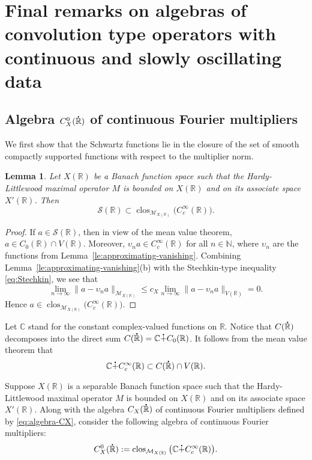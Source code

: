 \documentclass[reqno]{amsproc}
\newcommand{\cM}{\mathcal{M}}
\newcommand{\dR}{{\bf\dot{\R}}}
\newcommand{\C}{\mathbb{C}}
\newcommand{\N}{\mathbb{N}}
\newcommand{\R}{\mathbb{R}}
\newtheorem{lemma}[theorem]{Lemma}
\theoremstyle{definition}
\theoremstyle{remark}
\numberwithin{equation}{section}
\begin{document}
\section{Final remarks on algebras of convolution type operators with 
continuous and slowly oscillating data}
\label{sec:SO}
\subsection{Algebra $C_X^0(\dR)$ of continuous Fourier multipliers}
We first show that the Schwartz functions lie in the closure of the set 
of smooth compactly supported functions with respect to the multiplier norm.
\begin{lemma}\label{le:Schwartz-in-CX0}
Let $X(\R)$ be a Banach function space such that the Hardy-Little\-wood
maximal operator $M$ is bounded on $X(\R)$ and on its associate
space $X'(\R)$. Then 
\[
\mathcal{S}(\R)\subset \operatorname{clos}_{\cM_{X(\R)}}\big(C_c^\infty(\R)\big).
\]
\end{lemma}
\begin{proof}
If $a\in\mathcal{S}(\R)$, then in view of the mean value theorem,
$a\in C_0(\R)\cap V(\R)$. Moreover, $\upsilon_n a\in C_c^\infty(\R)$
for all $n\in\N$, where $\upsilon_n$ are the functions from 
Lemma~\ref{le:approximating-vanishing}. Combining 
Lemma~\ref{le:approximating-vanishing}(b) with the Stechkin-type inequality 
\eqref{eq:Stechkin}, we see that
\[
\lim_{n\to\infty}\|a-\upsilon_n a\|_{\cM_{X(\R)}}
\le 
c_X\lim_{n\to\infty}\|a-\upsilon_n a\|_{V(\R)}=0.
\]
Hence 
$a\in\operatorname{clos}_{\cM_{X(\R)}}\big(C_c^\infty(\R)\big)$.
\end{proof}
Let $\C$ stand for the constant complex-valued functions on $\R$. Notice that 
$C(\dR)$ decomposes into the direct sum $C(\dR)=\C\mathbf{\dot{+}}C_0(\R)$. 
It follows from the mean value theorem
that
\begin{equation}\label{eq:embedding-of-classes-of-conitnuous-functions}
\C\mathbf{\dot{+}}C_c^\infty(\R)\subset C(\dR)\cap V(\R).
\end{equation}

Suppose $X(\R)$ is a separable Banach function space such that the 
Hardy-Little\-wood maximal operator $M$ is bounded on $X(\R)$
and on its associate space $X'(\R)$. Along with the algebra
$C_X(\dR)$ of continuous Fourier multipliers defined by
\eqref{eq:algebra-CX}, consider the following algebra of continuous 
Fourier multipliers:
\begin{equation}\label{eq:algebra-CX0}
C_{X}^0(\dR):=\operatorname{clos}_{\cM_{X(\R)}}
\big(\C\mathbf{\dot{+}}C_c^\infty(\R)\big).
\end{equation}
\end{document}
